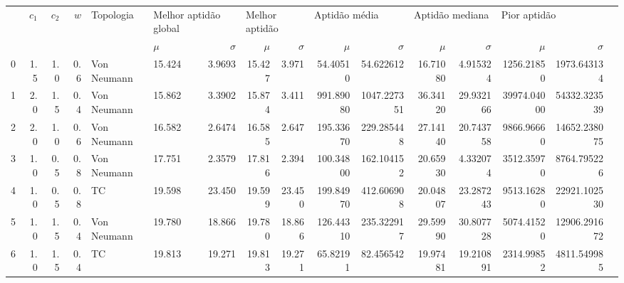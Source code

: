 \begin{tabular}{lrrrllrrrrrrrrrr}
\toprule
{} &  $c_1$ &  $c_2$ &    $w$ &                Topologia  & \multicolumn{2}{l}{Melhor aptidão global} & \multicolumn{2}{l}{Melhor aptidão} & \multicolumn{2}{l}{Aptidão média} & \multicolumn{2}{l}{Aptidão mediana} & \multicolumn{2}{l}{Pior aptidão} \\
{} & &  & & &                $\mu$ &           $\sigma$ &          $\mu$ &           $\sigma$ &          $\mu$ &           $\sigma$ &           $\mu$ &           $\sigma$ &          $\mu$ &           $\sigma$ \\
\midrule
0  & 1.5  & 1.0  & 0.6  & Von Neumann & 15.424                                  & 3.9693                           & 15.427                           & 3.971                              & 54.40510  & 54.622612   & 16.71080 & 4.915324  & 1256.21850  & 1973.643134  \\
1  & 2.0  & 1.5  & 0.4  & Von Neumann & 15.862                                  & 3.3902                           & 15.874                           & 3.411                              & 991.89080 & 1047.227351 & 36.34120 & 29.932166 & 39974.04000 & 54332.323539 \\
2  & 2.0  & 1.0  & 0.6  & Von Neumann & 16.582                                  & 2.6474                           & 16.585                           & 2.647                              & 195.33670 & 229.285448  & 27.14140 & 20.743758 & 9866.96660  & 14652.238075 \\
3  & 1.0  & 0.5  & 0.8  & Von Neumann & 17.751                                  & 2.3579                           & 17.816                           & 2.394                              & 100.34800 & 162.104152  & 20.65930 & 4.332074  & 3512.35970  & 8764.795226  \\
4  & 1.0  & 0.5  & 0.8  & TC          & 19.598                                  & 23.450                           & 19.599                           & 23.450                             & 199.84970 & 412.606908  & 20.04807 & 23.287243 & 9513.16280  & 22921.102530 \\
5  & 1.0  & 1.5  & 0.4  & Von Neumann & 19.780                                  & 18.866                           & 19.780                           & 18.866                             & 126.44310 & 235.322917  & 29.59990 & 30.807728 & 5074.41520  & 12906.291672 \\
6  & 1.0  & 1.5  & 0.4  & TC          & 19.813                                  & 19.271                           & 19.813                           & 19.271                             & 65.82191  & 82.456542   & 19.97481 & 19.210891 & 2314.99852  & 4811.549985  \\

\end{tabular}
